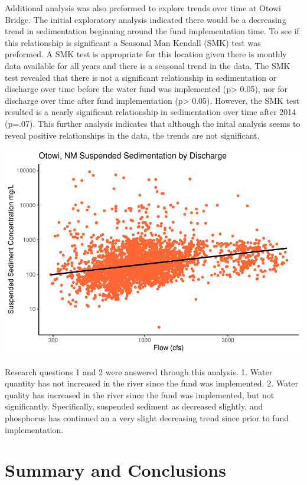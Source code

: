 \documentclass[
  12pt,
]{article}
\begin{document}
Additional analysis was also preformed to explore trends over time at
Otowi Bridge. The initial exploratory analysis indicated there would be
a decreasing trend in sedimentation beginning around the fund
implementation time. To see if this relationship is significant a
Seasonal Man Kendall (SMK) test was preformed. A SMK test is appropriate
for this location given there is monthly data available for all years
and there is a seasonal trend in the data. The SMK test revealed that
there is not a significant relationship in sedimentation or discharge
over time before the water fund was implemented (p\textgreater{} 0.05),
nor for discharge over time after fund implementation (p\textgreater{}
0.05). However, the SMK test resulted is a nearly significant
relationship in sedimentation over time after 2014 (p=.07). This further
analysis indicates that although the inital analysis seems to reveal
positive relationships in the data, the trends are not significant.

\includegraphics{Project_Template_files/figure-latex/unnamed-chunk-6-1.pdf}

Research questions 1 and 2 were answered through this analysis. 1. Water
quantity has not increased in the river since the fund was implemented.
2. Water quality has increased in the river since the fund was
implemented, but not significantly. Specifically, suspended sediment as
decreased slightly, and phosphorus has continued an a very slight
decreasing trend since prior to fund implementation.

\newpage

\hypertarget{summary-and-conclusions}{%
\section{Summary and Conclusions}\label{summary-and-conclusions}}
\end{document}

